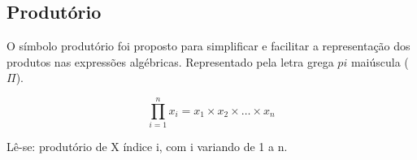 





\subsection{Produtório}

O símbolo produtório foi proposto para simplificar e facilitar a representação dos produtos nas expressões algébricas. Representado pela letra grega $pi$ maiúscula ($\Pi$).


\begin{equation}\label{}
    \prod_{i=1}^{n}x_{i}= x_{1} \times x_{2} \times  \ldots \times x_{n}
\end{equation}


Lê-se: produtório de X índice i, com i variando de 1 a n.

\vskip0.3cm

